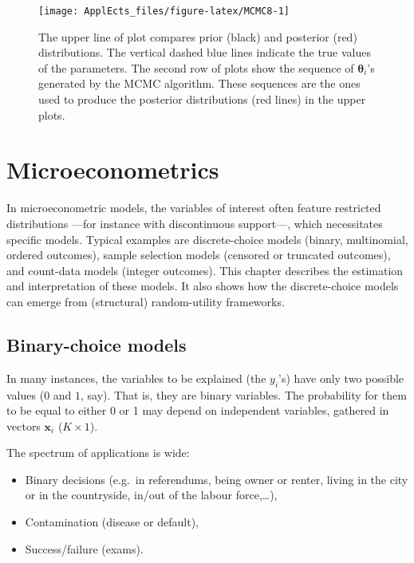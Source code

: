 \documentclass[
  12pt,
]{book}
\providecommand{\tightlist}{%
  \setlength{\itemsep}{0pt}\setlength{\parskip}{0pt}}
\theoremstyle{definition}
\theoremstyle{definition}
\theoremstyle{definition}
\theoremstyle{definition}
\theoremstyle{remark}
\begin{document}
\begin{figure}
\texttt{[image: ApplEcts\_files/figure-latex/MCMC8-1]} \caption{The upper line of plot compares prior (black) and posterior (red) distributions. The vertical dashed blue lines indicate the true values of the parameters. The second row of plots show the sequence of $\boldsymbol\theta_i$'s generated by the MCMC algorithm. These sequences are the ones used to produce the posterior distributions (red lines) in the upper plots.}\label{fig:MCMC8}
\end{figure}

\hypertarget{microeconometrics}{%
\chapter{Microeconometrics}\label{microeconometrics}}

In microeconometric models, the variables of interest often feature restricted distributions ---for instance with discontinuous support---, which necessitates specific models. Typical examples are discrete-choice models (binary, multinomial, ordered outcomes), sample selection models (censored or truncated outcomes), and count-data models (integer outcomes). This chapter describes the estimation and interpretation of these models. It also shows how the discrete-choice models can emerge from (structural) random-utility frameworks.

\hypertarget{binary-choice-models}{%
\section{Binary-choice models}\label{binary-choice-models}}

In many instances, the variables to be explained (the \(y_i\)'s) have only two possible values (\(0\) and \(1\), say). That is, they are binary variables. The probability for them to be equal to either 0 or 1 may depend on independent variables, gathered in vectors \(\mathbf{x}_i\) (\(K \times 1\)).

The spectrum of applications is wide:

\begin{itemize}
\tightlist
\item
  Binary decisions (e.g.~in referendums, being owner or renter, living in the city or in the countryside, in/out of the labour force,\ldots),
\item
  Contamination (disease or default),
\item
  Success/failure (exams).
\end{itemize}
\end{document}
